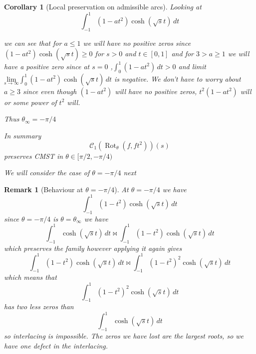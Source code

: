 \documentclass[11pt]{article}
\theoremstyle{breakdef}
\newtheorem{corollary}[theorem]{Corollary}
\newtheorem{remark}[theorem]{Remark}
\newcommand{\Rot}{\operatorname{Rot}_{\theta}}
\begin{document}
\begin{corollary}[Local preservation on admissible arcs]
Looking at
\begin{equation}
\int_{-1}^1 \left(1-a t^2\right) \cosh \left(\sqrt{s} t\right) \, dt
\end{equation}

we can see that for $a \le 1$ we will have no positive zeros since $\left(1-a t^2\right) \cosh \left(\sqrt{s} t\right) \ge 0$ for $s>0$ and $t \in [0,1]$ and for $3 > a \ge 1$ we will have a positive zero since at $s = 0$ ,$\int_0^1 \left(1-a t^2\right) \, dt >0 $ and limit $\underset{s\to \infty }{\text{lim}}\int_0^1 \left(1-a t^2\right) \cosh \left(\sqrt{s} t\right) \, dt$ is negative.  We don't have to worry about $a \ge 3$ since even though $(1-a t^2)$ will have no positive zeros, $t^2(1-a t^2)$ will or some power of $t^2$ will.

Thus $\theta_{\infty} = -\pi/4$ 


In summary
\begin{equation}
\mathcal{C}_{1}(\Rot({f},{f t^2}))(s) 
\end{equation}
preserves CMST in  $\theta \in [\pi/2, -\pi/4)$

We will consider the case of $\theta = -\pi/4$ next

\end{corollary}
\begin{remark}[Behaviour at $\theta = -\pi/4$]
At $\theta = -\pi/4$ we have
\begin{equation}
\int_{-1}^1 \left(1-t^2\right) \cosh \left(\sqrt{s} t\right) \, dt
\end{equation}
since $\theta = -\pi/4$ is $\theta =\theta_{\infty}$ we have 
\begin{equation}
\int_{-1}^1 \cosh \left(\sqrt{s} t\right) \, dt \bowtie \int_{-1}^1 \left(1-t^2\right) \cosh \left(\sqrt{s} t\right) \, dt
\end{equation}
which preserves the family however applying it again gives
\begin{equation}
\int_{-1}^1 \left(1-t^2\right) \cosh \left(\sqrt{s} t\right) \, dt \bowtie \int_{-1}^1 \left(1-t^2\right)^2 \cosh \left(\sqrt{s} t\right) \, dt
\end{equation}
which means that 
\begin{equation}
 \int_{-1}^1 \left(1-t^2\right)^2 \cosh \left(\sqrt{s} t\right) \, dt
\end{equation}
has two less zeros than
\begin{equation}
\int_{-1}^1 \cosh \left(\sqrt{s} t\right) \, dt
\end{equation}
so interlacing is impossible.  The zeros we have lost are the largest roots, so we have one defect in the interlacing.

\end{remark}
\end{document}
